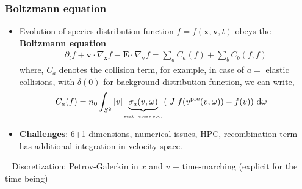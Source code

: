 \documentclass[mathserif, aspectratio=169]{beamer}
\newcommand{\ud}{\,\mathrm{d}}
\newcommand{\vect}[1]{\boldsymbol{#1}}
\begin{document}
	\begin{frame}
		\frametitle{Boltzmann equation}
		\begin{itemize}
			\item Evolution of species distribution function $f = f(\vect{x}, \vect{v}, t)$ obeys the \textbf{Boltzmann equation}
			\small
			\begin{align*}
				\partial_t f + \vect{v}\cdot \nabla_{\vect{x}} f  - \vect{E} \cdot \nabla_{\vect{v }}f = \sum_{a} C_a(f) + \sum_{b} C_b(f,f)
			\end{align*}
			where, $C_a$ denotes the collision term, for example, in case of $a=$ elastic collisions, with $\delta(0)$ for background distribution function, we can write,  
			\begin{align*}
				C_a(f) &= n_0\int_{S^2} |v| \underbrace{\sigma_a(v,\omega)}_{\tiny\text{\tiny scat. cross sec.}} 
				\left(|J|f(v^{\mathrm{pre}}(v,\omega)) - f(v) \right) \ud \omega 
			\end{align*}
			\item \textbf{Challenges}: 6+1 dimensions, numerical issues,  HPC, recombination term has additional integration in velocity space. 
		\end{itemize}
		\textbullet~ Discretization: Petrov-Galerkin in $x$ and $v$ + time-marching (explicit for the time being)
	\end{frame}
\end{document}
